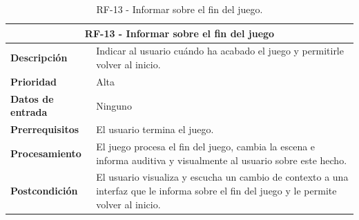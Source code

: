 \begin{table}[H]
	\centering
	\caption{RF-13 -  Informar sobre el fin del juego.}
	\label{table:RF13}
	\begin{tabular}{|l|p{10cm}|}
		\hline
		\multicolumn{2}{|c|}{\textbf{RF-13 -  Informar sobre el fin del juego}} \\
		\hline
		\textbf{Descripción} & Indicar al usuario cuándo ha acabado el juego y permitirle volver al inicio.   \\
		\hline
		\textbf{Prioridad} & Alta \\
		\hline
		\textbf{Datos de entrada} & Ninguno \\
		\hline
		\textbf{Prerrequisitos} & El usuario termina el juego. \\
		\hline
		\textbf{Procesamiento} & El juego procesa el fin del juego, cambia la escena e informa auditiva y visualmente al usuario sobre este hecho. \\
		\hline
		\textbf{Postcondición} & El usuario visualiza y escucha un cambio de contexto a una interfaz que le informa sobre el fin del juego y le permite volver al inicio. \\
		\hline
	\end{tabular}
	
\end{table}

